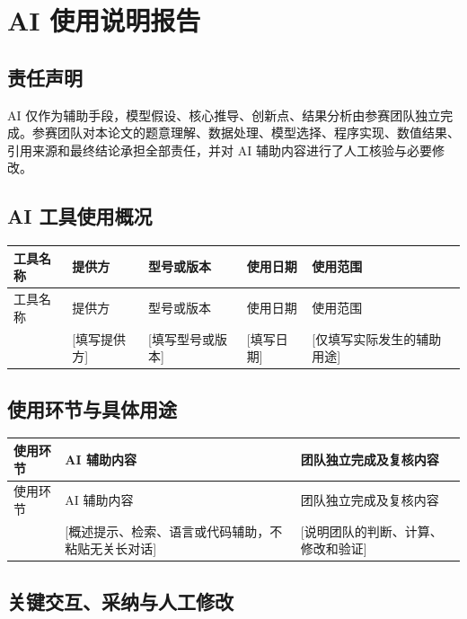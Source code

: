 \section{AI 使用说明报告}

\subsection{责任声明}

AI 仅作为辅助手段，模型假设、核心推导、创新点、结果分析由参赛团队独立完成。参赛团队对本论文的题意理解、数据处理、模型选择、程序实现、数值结果、引用来源和最终结论承担全部责任，并对 AI 辅助内容进行了人工核验与必要修改。

\subsection{AI 工具使用概况}

\begin{longtable}{p{}p{}p{}p{}p{}}
\toprule
工具名称 & 提供方 & 型号或版本 & 使用日期 & 使用范围 \\
\midrule
\endfirsthead
\toprule
工具名称 & 提供方 & 型号或版本 & 使用日期 & 使用范围 \\
\midrule
\endhead
[填写工具名称] & [填写提供方] & [填写型号或版本] & [填写日期] & [仅填写实际发生的辅助用途] \\
\bottomrule
\end{longtable}

\subsection{使用环节与具体用途}

\begin{longtable}{p{}p{}p{}}
\toprule
使用环节 & AI 辅助内容 & 团队独立完成及复核内容 \\
\midrule
\endfirsthead
\toprule
使用环节 & AI 辅助内容 & 团队独立完成及复核内容 \\
\midrule
\endhead
[填写实际环节] & [概述提示、检索、语言或代码辅助，不粘贴无关长对话] & [说明团队的判断、计算、修改和验证] \\
\bottomrule
\end{longtable}

\subsection{关键交互、采纳与人工修改}


